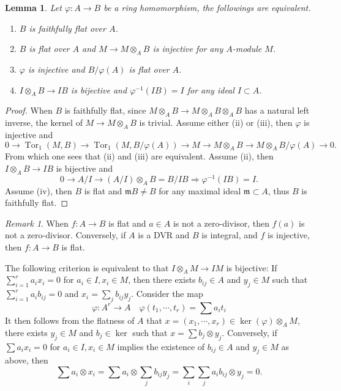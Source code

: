 \documentclass[leqno]{amsart}
\newcommand{\1}{\mathbf{1}}
\newcommand{\fm}{\mathfrak m}
\DeclareMathOperator{\Tor}{Tor}
\newtheorem{lem}[thm]{Lemma}
\theoremstyle{definition}
\theoremstyle{remark}
\newtheorem{rem}[thm]{Remark}
\begin{document}
\begin{lem}
	Let $\varphi\colon A\to B$ be a ring homomorphism,
	the followings are equivalent.
\begin{enumerate}
	\item $B$ is faithfully flat over $A$.
	\item $B$ is flat over $A$ and 
	 $M\to M\otimes_AB$ is injective for any  $A$-module $M$.
	\item  $\varphi$ is injective and 
	$B/\varphi(A)$ is flat over $A$.
	\item  $I\otimes_AB\to IB$ is bijective
	and  $\varphi^{-1}(IB)=I$ for any ideal $I\subset A$.
\end{enumerate}
\end{lem}
\begin{proof}
	When $B$ is faithfully flat,
	since $M\otimes_AB\to M\otimes_AB\otimes_AB$
	has a natural left inverse,
	the kernel of $M\to M\otimes_AB$ is trivial.
	Assume either (ii) or (iii),
	then $\varphi$ is injective and 
	\[
		 0\to\Tor_1(M,B)\to \Tor_1(M,B/\varphi(A))\to 
		 M\to M\otimes_AB\to M\otimes_AB/\varphi(A)\to 0.
	\]
	From which one sees that (ii) and (iii) are equivalent.
	Assume (ii), then $I\otimes_AB\to IB$ is bijective and
	\[
		0\to A/I\to (A/I)\otimes_AB=B/IB \Longrightarrow
		\varphi^{-1}(IB)=I.
	\]
	Assume (iv), then $B$ is flat 
	and  $\fm B\neq B$ for any maximal ideal  $\fm\subset A$,
	thus  $B$ is faithfully flat.
\end{proof}

\begin{rem}
	When $f\colon A\to B$ is flat and  $a\in A$ is not a zero-divisor,
	then  $f(a)$ is not a zero-divisor.
	Conversely, if $A$ is a DVR and $B$ is integral,
	and  $f$ is injective, then  $f\colon A\to B$ is flat.
\end{rem}

The following criterion is equivalent to
that $I\otimes_AM\to IM$ is bijective:
If  $\sum_{i=1}^ra_ix_i=0$ for $a_i\in I, x_i\in M$,
then there exists  $b_{ij}\in A$ and $y_j\in M$ such that
$\sum_{i=1}^ra_ib_{ij}=0$ and  $x_i=\sum_{j}b_{ij}y_j$.
Consider the map
\[
	 \varphi\colon A^r\to A\quad
	 \varphi(t_1,\cdots,t_r)=
	 \sum a_it_i
\]
It then follows from the flatness of $A$ that
$x=(x_1,\cdots,x_r)\in \ker(\varphi)\otimes_AM$,
there exists $y_j\in M$ and  $b_j\in \ker$
such that  $x=\sum b_j\otimes y_j$.
Conversely, if $\sum a_ix_{i}=0$ for $a_i\in I, x_i\in M$ 
implies the existence of $b_{ij}\in A$ and $y_j\in M$ as above,
then
\[
	\sum a_i\otimes x_i=
	\sum a_i\otimes \sum_j b_{ij}y_j=
	\sum_i \sum_ja_ib_{ij}\otimes y_j=
	0.
\]
\end{document}
